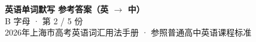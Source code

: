 \documentclass[10pt,a4paper]{article}
\begin{document}
\pagestyle{plain}

\begin{center}
{\LARGE\bfseries 英语单词默写 \quad 参考答案（英 $\to$ 中）}\\[0.22em]
{\large B 字母 · 第 2 / 5 份}\\[0.18em]
{\small 2026年上海市高考英语词汇用法手册 · 参照普通高中英语课程标准}
\end{center}

\vspace{0.2em}
\noindent{\color{rulegray}\rule{\textwidth}{0.8pt}}

\vspace{0.35em}

\vspace{0.25em}
\renewcommand{\arraystretch}{1.32}
\end{document}
